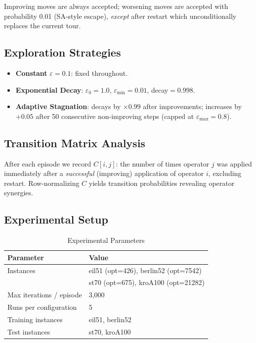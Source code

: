 \documentclass[10pt,twocolumn]{article}
\begin{document}
Improving moves are always accepted; worsening moves are accepted with
probability 0.01 (SA-style escape), \emph{except} after restart which
unconditionally replaces the current tour.

\subsection{Exploration Strategies}

\begin{itemize}\itemsep0pt
  \item \textbf{Constant} $\varepsilon=0.1$: fixed throughout.
  \item \textbf{Exponential Decay}: $\varepsilon_0{=}1.0$, $\varepsilon_{\min}{=}0.01$,
        decay$=0.998$.
  \item \textbf{Adaptive Stagnation}: decays by $\times0.99$ after improvements;
        increases by $+0.05$ after 50 consecutive non-improving steps
        (capped at $\varepsilon_{\max}{=}0.8$).
\end{itemize}

\subsection{Transition Matrix Analysis}

After each episode we record $C[i,j]$: the number of times operator $j$ was
applied immediately after a \emph{successful} (improving) application of
operator $i$, excluding restart. Row-normalizing $C$ yields transition
probabilities revealing operator synergies.

\subsection{Experimental Setup}

\begin{table}[H]
\centering
\caption{Experimental Parameters}
\small
\begin{tabular}{ll}
\toprule
\textbf{Parameter} & \textbf{Value} \\
\midrule
Instances & eil51 (opt=426), berlin52 (opt=7542) \\
          & st70 (opt=675), kroA100 (opt=21282) \\
Max iterations / episode & 3,000 \\
Runs per configuration & 5 \\
Training instances & eil51, berlin52 \\
Test instances & st70, kroA100 \\
\bottomrule
\end{tabular}
\end{table}
\end{document}
